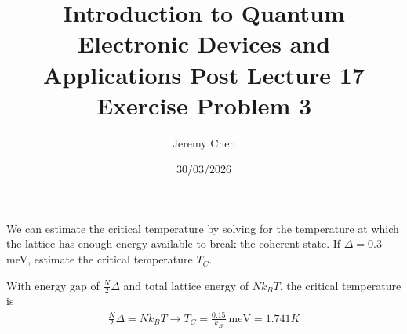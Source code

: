 \documentclass[10pt,letterpaper]{article}
\title{Introduction to Quantum Electronic Devices and Applications Post Lecture 17 Exercise Problem 3}
\author{Jeremy Chen}
\date{30/03/2026}
\begin{document}
	\maketitle

\noindent We can estimate the critical temperature by solving for the temperature at which the lattice has enough energy available to break the coherent state. If $\Delta = 0.3$ meV, estimate the critical temperature $T_{C}$.

\color{violet}
With energy gap of $\frac{N}{2}\Delta$ and total lattice energy of $Nk_{B}T$, the critical temperature is
\begin{gather*}
\frac{N}{2}\Delta = Nk_{B}T \rightarrow T_{C} = \frac{0.15}{k_{B}}\ \text{meV} = 1.741 K
\end{gather*}
\color{black}
\end{document}
